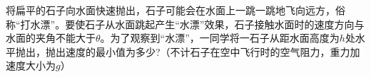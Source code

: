 将扁平的石子向水面快速抛出，石子可能会在水面上一跳一跳地飞向远方，俗称“打水漂”。要使石子从水面跳起产生“水漂”效果，石子接触水面时的速度方向与水面的夹角不能大于\(\theta\)。为了观察到“水漂”，一同学将一石子从距水面高度为\(h\)处水平抛出，抛出速度的最小值为多少?（不计石子在空中飞行时的空气阻力，重力加速度大小为\(g\)）